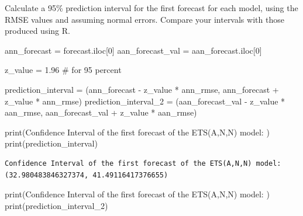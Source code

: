 \documentclass[
  11pt,
]{article}
\newenvironment{Shaded}{\begin{snugshade}}{\end{snugshade}}
\newcommand{\BuiltInTok}[1]{\textcolor[rgb]{0.00,0.23,0.31}{#1}}
\newcommand{\CommentTok}[1]{\textcolor[rgb]{0.37,0.37,0.37}{#1}}
\newcommand{\DecValTok}[1]{\textcolor[rgb]{0.68,0.00,0.00}{#1}}
\newcommand{\FloatTok}[1]{\textcolor[rgb]{0.68,0.00,0.00}{#1}}
\newcommand{\NormalTok}[1]{\textcolor[rgb]{0.00,0.23,0.31}{#1}}
\newcommand{\OperatorTok}[1]{\textcolor[rgb]{0.37,0.37,0.37}{#1}}
\newcommand{\StringTok}[1]{\textcolor[rgb]{0.13,0.47,0.30}{#1}}
\begin{document}
Calculate a 95\% prediction interval for the first forecast for each
model, using the RMSE values and assuming normal errors. Compare your
intervals with those produced using R.

\begin{Shaded}
\begin{Highlighting}[]
\NormalTok{ann\_forecast }\OperatorTok{=}\NormalTok{ forecast.iloc[}\DecValTok{0}\NormalTok{]}
\NormalTok{aan\_forecast\_val  }\OperatorTok{=}\NormalTok{ aan\_forecast.iloc[}\DecValTok{0}\NormalTok{]}

\NormalTok{z\_value }\OperatorTok{=} \FloatTok{1.96} \CommentTok{\# for 95 percent }

\NormalTok{prediction\_interval }\OperatorTok{=}\NormalTok{ (ann\_forecast }\OperatorTok{{-}}\NormalTok{ z\_value }\OperatorTok{*}\NormalTok{ ann\_rmse, ann\_forecast }\OperatorTok{+}\NormalTok{ z\_value }\OperatorTok{*}\NormalTok{ ann\_rmse)}
\NormalTok{prediction\_interval\_2 }\OperatorTok{=}\NormalTok{ (aan\_forecast\_val }\OperatorTok{{-}}\NormalTok{ z\_value }\OperatorTok{*}\NormalTok{ aan\_rmse, aan\_forecast\_val }\OperatorTok{+}\NormalTok{ z\_value }\OperatorTok{*}\NormalTok{ aan\_rmse)}
\end{Highlighting}
\end{Shaded}

\begin{Shaded}
\begin{Highlighting}[]

\BuiltInTok{print}\NormalTok{(}\StringTok{\textquotesingle{}Confidence Interval of the first forecast of the ETS(A,N,N) model: \textquotesingle{}}\NormalTok{)}
\BuiltInTok{print}\NormalTok{(prediction\_interval)}
\end{Highlighting}
\end{Shaded}

\begin{verbatim}
Confidence Interval of the first forecast of the ETS(A,N,N) model: 
(32.980483846327374, 41.49116417376655)
\end{verbatim}

\begin{Shaded}
\begin{Highlighting}[]
\BuiltInTok{print}\NormalTok{(}\StringTok{\textquotesingle{}Confidence Interval of the first forecast of the ETS(A,N,N) model: \textquotesingle{}}\NormalTok{)}
\BuiltInTok{print}\NormalTok{(prediction\_interval\_2)}
\end{Highlighting}
\end{Shaded}
\end{document}
